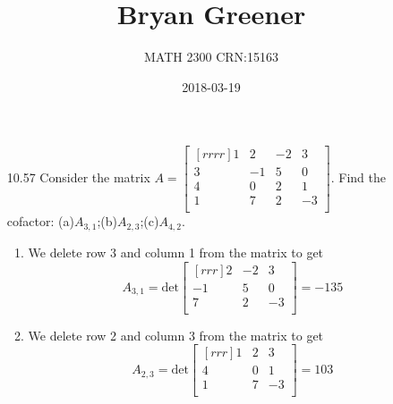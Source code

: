 \documentclass[12pt]{article}
\title{Bryan Greener}
\author{MATH 2300 CRN:15163}
\date{2018-03-19}
\theoremstyle{definition}
\theoremstyle{plain}
\begin{document}
\maketitle

\TabPositions{4cm}

\begin{enumerate}
\item[10.57]Consider the matrix $A=\begin{bmatrix}[rrrr]1&2&-2&3\\3&-1&5&0\\4&0&2&1\\1&7&2&-3\\\end{bmatrix}$. Find the cofactor: (a)$A_{3,1}$;(b)$A_{2,3}$;(c)$A_{4,2}$.
	\begin{enumerate}
	\item We delete row 3 and column 1 from the matrix to get
	\[ A_{3,1}=\mathrm{det}\begin{bmatrix}[rrr]2&-2&3\\-1&5&0\\7&2&-3\\\end{bmatrix} = -135 \]
	\item We delete row 2 and column 3 from the matrix to get
	\[ A_{2,3}=\mathrm{det}\begin{bmatrix}[rrr]1&2&3\\4&0&1\\1&7&-3\\\end{bmatrix} = 103 \]
	\end{enumerate}
	

\end{enumerate}
\end{document}
